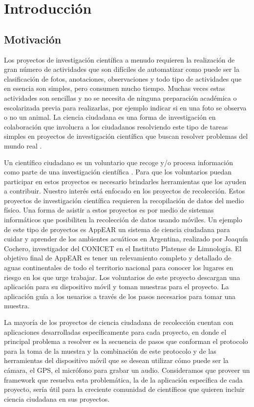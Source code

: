\chapter{Introducción}

\label{introduccion}

\section{ Motivación } \label{sec:motivacion}

Los proyectos de investigación científica a menudo requieren la realización de gran número de actividades que son difíciles de automatizar como puede ser la clasificación de fotos, anotaciones, observaciones y todo tipo de actividades que en esencia son simples, pero consumen mucho tiempo. Muchas veces estas actividades son sencillas y no se necesita de ninguna preparación académica o escolarizada previa para realizarlas, por ejemplo indicar si en una foto se observa o no un animal. La ciencia ciudadana es una forma de investigación en colaboración que involucra a los ciudadanos resolviendo este tipo de tareas simples en proyectos de investigación científica que buscan resolver problemas del mundo real \cite{wiggins2011conservation}. 

Un científico ciudadano es un voluntario que recoge y/o procesa información como parte de una investigación científica \cite{silvertown2009new}. Para que los voluntarios puedan participar en estos proyectos es necesario brindarles herramientas que los ayuden a contribuir. 
Nuestro interés está enfocado en los proyectos de recolección. Estos proyectos de investigación científica requieren la recopilación de datos del medio físico. Una forma de asistir a estos proyectos es por medio de sistemas informáticos que posibiliten la recolección de datos usando móviles. Un ejemplo de este tipo de proyectos es AppEAR un sistema de ciencia ciudadana para cuidar y aprender de los ambientes acuáticos en Argentina, realizado por Joaquín Cochero, investigador del CONICET en el Instituto Platense de Limnología. El objetivo final de AppEAR es tener un relevamiento completo y detallado de aguas continentales de todo el territorio nacional para conocer los lugares en riesgo en los que urge trabajar. Los voluntarios de este proyecto descargan una aplicación para su dispositivo móvil y toman muestras para el proyecto. La aplicación guía a los usuarios a través de los pasos necesarios para tomar una muestra.

La mayoría de los proyectos de ciencia ciudadana de recolección cuentan con aplicaciones desarrolladas específicamente para cada proyecto, en donde el principal problema a resolver es la secuencia de pasos que conforman el protocolo para la toma de la muestra y la combinación de este protocolo y de las herramientas del dispositivo móvil que se desean utilizar cómo puede ser la cámara, el GPS, el micrófono para grabar un audio. Consideramos que proveer un framework que resuelva esta problemática, la de la aplicación específica de cada proyecto, sería útil para la creciente comunidad de científicos que quieren incluir ciencia ciudadana en sus proyectos.

